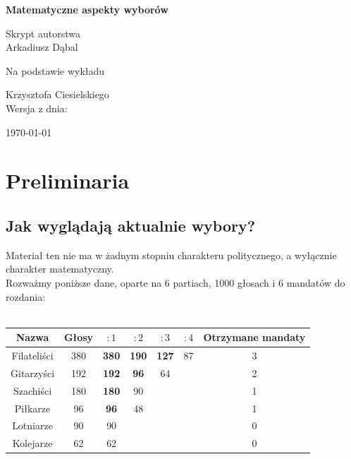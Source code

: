 \documentclass[12pt,a4paper]{article}
\theoremstyle{break}
\begin{document}
	
	\begin{titlepage}
		\centering
		\vspace*{1cm}
		{\Huge\bfseries Matematyczne aspekty wyborów \par} 
		\vspace{1.5cm}
		{\large Skrypt autorstwa}\\
		\vspace{0.5cm}
		{\Large Arkadiusz Dąbal}\\
		\vspace{1cm}
		{\large Na podstawie wykładu \par} 
		\vspace{0.5cm}
		{\Large Krzysztofa Ciesielskiego}\\
		\vfill 
		{\large Wersja z dnia:}\\
		{\Large \today \par}  
		\vspace*{1cm}
	\end{titlepage}
	\newpage
	\tableofcontents
	\newpage
\section{Preliminaria}
\subsection{Jak wyglądają aktualnie wybory?}
Materiał ten nie ma w żadnym stopniu charakteru politycznego, a wyłącznie charakter matematyczny.\\

Rozważmy poniższe dane, oparte na 6 partiach, 1000 głosach i 6 mandatów do rozdania:\\\\
\begin{tabular}{|c|c|c|c|c|c|c|}\hline
	Nazwa        & Głosy & $:1$ & $:2$ & $:3$ & $:4$ & Otrzymane mandaty\\\hline
	Filateliści  & 380   & \textbf{380} & \textbf{190} & \textbf{127} & 87   & 3\\\hline
	Gitarzyści   & 192   & \textbf{192} & \textbf{96}  & 64   &       & 2\\\hline
	Szachiści    & 180   & \textbf{180} & 90    &       &       & 1\\\hline
	Piłkarze     & 96    & \textbf{96}  & 48    &       &       & 1\\\hline
	Lotniarze    & 90    & 90    &       &       &       & 0\\\hline
	Kolejarze    & 62    & 62    &       &       &       & 0\\\hline
\end{tabular}\\
\end{document}
